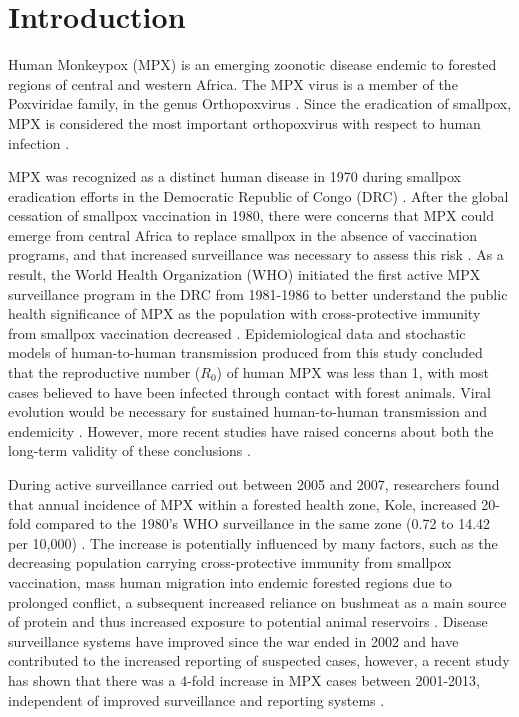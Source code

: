 \section{Introduction}
Human Monkeypox (MPX) is an emerging zoonotic disease endemic to forested regions of central and western Africa. The MPX virus is a member of the Poxviridae family, in the genus Orthopoxvirus \cite{Kulesh2004}. Since the eradication of smallpox, MPX is considered the most important orthopoxvirus with respect to human infection \cite{Khodakevich1988, WorldHealthOraganization1980, Fine1988}.

MPX was recognized as a distinct human disease in 1970 during smallpox eradication efforts in the Democratic Republic of Congo (DRC) \cite{Foster1972, WorldHealthOraganization1984}. After the global cessation of smallpox vaccination in 1980, there were concerns that MPX could emerge from central Africa to replace smallpox in the absence of vaccination programs, and that increased surveillance was necessary to assess this risk \cite{WorldHealthOraganization1980, Rimoin2010}. As a result, the World Health Organization (WHO) initiated the first active MPX surveillance program in the DRC from 1981-1986 to better understand the public health significance of MPX as the population with cross-protective immunity from smallpox vaccination decreased \cite{WorldHealthOraganization1980}. Epidemiological data and stochastic models of human-to-human transmission produced from this study concluded that the reproductive number ($R_{0}$) of human MPX was less than 1, with most cases believed to have been infected through contact with forest animals. Viral evolution would be necessary for sustained human-to-human transmission and endemicity \cite{Fine1988, Jezek1986, Jezek1987, Jezek1986, DiGiulio2004}. However, more recent studies have raised concerns about both the long-term validity of these conclusions \cite{Rimoin2010, Blumberg2013}.

During active surveillance carried out between 2005 and 2007, researchers found that annual incidence of MPX within a forested health zone, Kole, increased 20-fold compared to the 1980’s WHO surveillance in the same zone (0.72 to 14.42 per 10,000) \cite{Rimoin2010}. The increase is potentially influenced by many factors, such as the decreasing population carrying cross-protective immunity from smallpox vaccination, mass human migration into endemic forested regions due to prolonged conflict, a subsequent increased reliance on bushmeat as a main source of protein and thus increased exposure to potential animal reservoirs \cite{Rimoin2010, Hoff2014, Rimoin2007}. Disease surveillance systems have improved since the war ended in 2002 and have contributed to the increased reporting of suspected cases, however, a recent study has shown that there was a 4-fold increase in MPX cases between 2001-2013, independent of improved surveillance and reporting systems \cite{Hoff2014}. 

